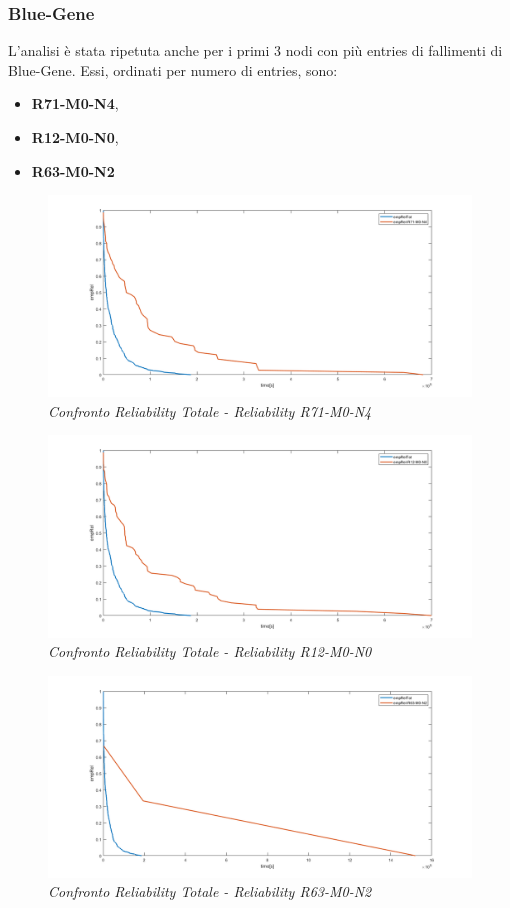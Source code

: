 \subsubsection{Blue-Gene}
L'analisi è stata ripetuta anche per i primi 3 nodi con più entries di fallimenti di Blue-Gene. Essi, ordinati per numero di entries, sono:
\begin{itemize}
	\item \textbf{R71-M0-N4},
	\item \textbf{R12-M0-N0},
	\item \textbf{R63-M0-N2}
\end{itemize} 
\begin{figure}[H]
	\centering
	\includegraphics[width=\textwidth]{img/hw6/Rel_Tot_R71.png}
	\caption{\textit{Confronto Reliability Totale - Reliability R71-M0-N4}}
\end{figure}
\begin{figure}[H]
	\centering
	\includegraphics[width=\textwidth]{img/hw6/Rel_Tot_R12.png}
	\caption{\textit{Confronto Reliability Totale - Reliability R12-M0-N0}}
\end{figure}
\begin{figure}[H]
	\centering
	\includegraphics[width=\textwidth]{img/hw6/Rel_Tot_R63.png}
	\caption{\textit{Confronto Reliability Totale - Reliability R63-M0-N2}}
\end{figure}
